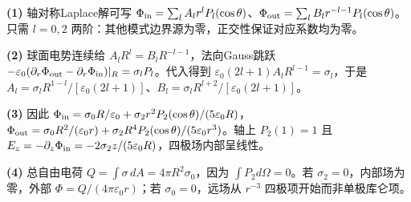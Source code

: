 \par\noindent\textbf{(1)} 轴对称Laplace解可写 \(\Phi_{\rm in}=\sum_l A_lr^lP_l(\cos\theta)\)、\(\Phi_{\rm out}=\sum_l B_lr^{-l-1}P_l(\cos\theta)\)。只需 \(l=0,2\) 两阶：其他模式边界源为零，正交性保证对应系数均为零。
\par\noindent\textbf{(2)} 球面电势连续给 \(A_lR^l=B_lR^{-l-1}\)，法向Gauss跳跃 \(-\varepsilon_0(\partial_r\Phi_{\rm out}-\partial_r\Phi_{\rm in})|_R=\sigma_lP_l\)。代入得到 \(\varepsilon_0(2l+1)A_lR^{l-1}=\sigma_l\)，于是 \(A_l=\sigma_lR^{1-l}/[\varepsilon_0(2l+1)]\)、\(B_l=\sigma_lR^{l+2}/[\varepsilon_0(2l+1)]\)。
\par\noindent\textbf{(3)} 因此 \(\Phi_{\rm in}=\sigma_0R/\varepsilon_0+\sigma_2r^2P_2(\cos\theta)/(5\varepsilon_0R)\)，\(\Phi_{\rm out}=\sigma_0R^2/(\varepsilon_0r)+\sigma_2R^4P_2(\cos\theta)/(5\varepsilon_0r^3)\)。轴上 \(P_2(1)=1\) 且 \(E_z=-\partial_z\Phi_{\rm in}=-2\sigma_2z/(5\varepsilon_0R)\)，四极场内部呈线性。
\par\noindent\textbf{(4)} 总自由电荷 \(Q=\int\sigma\,dA=4\pi R^2\sigma_0\)，因为 \(\int P_2d\Omega=0\)。若 \(\sigma_2=0\)，内部场为零，外部 \(\Phi=Q/(4\pi\varepsilon_0r)\)；若 \(\sigma_0=0\)，远场从 \(r^{-3}\) 四极项开始而非单极库仑项。
